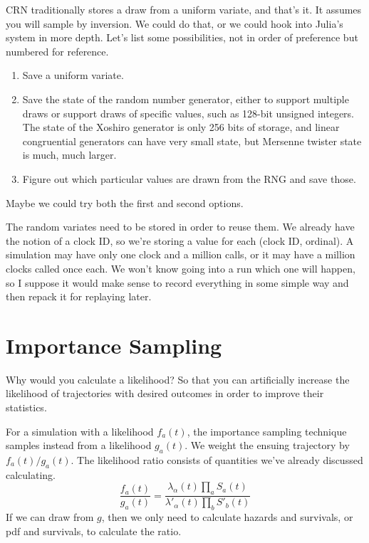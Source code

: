 \documentclass{article}
\begin{document}
CRN traditionally stores a draw from a uniform variate, and that's it. It assumes you will sample by inversion. We could do that, or we could hook into Julia's system in more depth. Let's list some possibilities, not in order of preference but numbered for reference.
\begin{enumerate}
	\item Save a uniform variate.
	\item Save the state of the random number generator, either to support multiple draws or support draws of specific values, such as 128-bit unsigned integers. The state of the Xoshiro generator is only 256 bits of storage, and linear congruential generators can have very small state, but Mersenne twister state is much, much larger.
	\item Figure out which particular values are drawn from the RNG and save those.
\end{enumerate}
Maybe we could try both the first and second options.

The random variates need to be stored in order to reuse them. We already have the notion of a clock ID, so we're storing a value for each (clock ID, ordinal). A simulation may have only one clock and a million calls, or it may have a million clocks called once each. We won't know going into a run which one will happen, so I suppose it would make sense to record everything in some simple way and then repack it for replaying later.


\section{Importance Sampling}

Why would you calculate a likelihood? So that you can artificially increase the likelihood of trajectories with desired outcomes in order to improve their statistics.

For a simulation with a likelihood $f_a(t)$, the importance sampling technique samples instead from a likelihood $g_a(t)$. We weight the ensuing trajectory by $f_a(t)/g_a(t)$. The likelihood ratio consists of quantities we've already discussed calculating.
\begin{equation}
	\frac{f_a(t)}{g_a(t)} = \frac{\lambda_{\alpha}(t)\prod_{a}S_a(t)}{\lambda'_{\alpha}(t)\prod_{b}S'_b(t)}\label{eqn:likelihoodratio}
\end{equation}
If we can draw from $g$, then we only need to calculate hazards and survivals, or pdf and survivals, to calculate the ratio.
\end{document}
